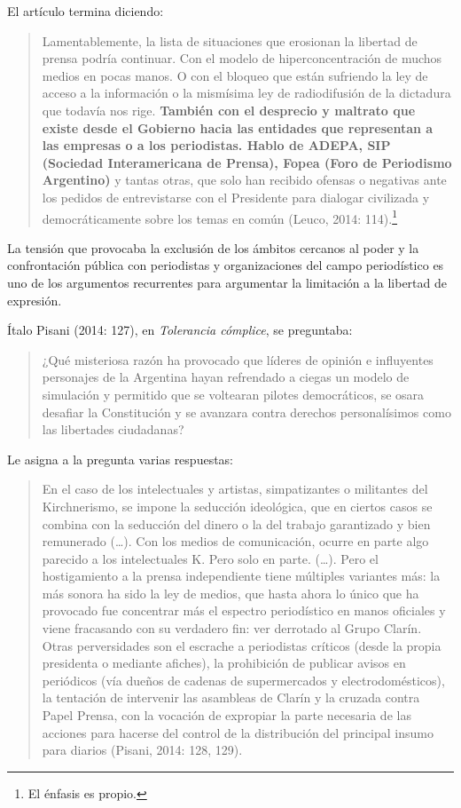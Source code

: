 {El artículo termina diciendo:

\begin{quote}
Lamentablemente, la lista de situaciones que erosionan la libertad de prensa podría continuar. Con el modelo de hiperconcentración de muchos medios en pocas manos. O con el bloqueo que están sufriendo la ley de acceso a la información o la mismísima ley de radiodifusión de la dictadura que todavía nos rige. \textbf{También con el desprecio y maltrato que existe desde el Gobierno hacia las entidades que representan a las empresas o a los periodistas. Hablo de ADEPA, SIP (Sociedad Interamericana de Prensa), Fopea (Foro de Periodismo Argentino)} y tantas otras, que solo han recibido ofensas o negativas ante los pedidos de entrevistarse con el Presidente para dialogar civilizada y democráticamente sobre los temas en común (Leuco, 2014: 114).\footnote{El énfasis es propio.}
\end{quote}

La tensión que provocaba la exclusión de los ámbitos cercanos al poder y la confrontación pública con periodistas y organizaciones del campo periodístico es uno de los argumentos recurrentes para argumentar la limitación a la libertad de expresión.

Ítalo Pisani (2014: 127), en \emph{Tolerancia cómplice}, se preguntaba:

\begin{quote}
¿Qué misteriosa razón ha provocado que líderes de opinión e influyentes personajes de la Argentina hayan refrendado a ciegas un modelo de simulación y permitido que se voltearan pilotes democráticos, se osara desafiar la Constitución y se avanzara contra derechos personalísimos como las libertades ciudadanas?
\end{quote}

Le asigna a la pregunta varias respuestas:

\begin{quote}
En el caso de los intelectuales y artistas, simpatizantes o militantes del Kirchnerismo, se impone la seducción ideológica, que en ciertos casos se combina con la seducción del dinero o la del trabajo garantizado y bien remunerado (\ldots). Con los medios de comunicación, ocurre en parte algo parecido a los intelectuales K. Pero solo en parte. (\ldots). Pero el hostigamiento a la prensa independiente tiene múltiples variantes más: la más sonora ha sido la ley de medios, que hasta ahora lo único que ha provocado fue concentrar más el espectro periodístico en manos oficiales y viene fracasando con su verdadero fin: ver derrotado al Grupo Clarín. Otras perversidades son el escrache a periodistas críticos (desde la propia presidenta o mediante afiches), la prohibición de publicar avisos en periódicos (vía dueños de cadenas de supermercados y electrodomésticos), la tentación de intervenir las asambleas de Clarín y la cruzada contra Papel Prensa, con la vocación de expropiar la parte necesaria de las acciones para hacerse del control de la distribución del principal insumo para diarios (Pisani, 2014: 128, 129).
\end{quote}

}
